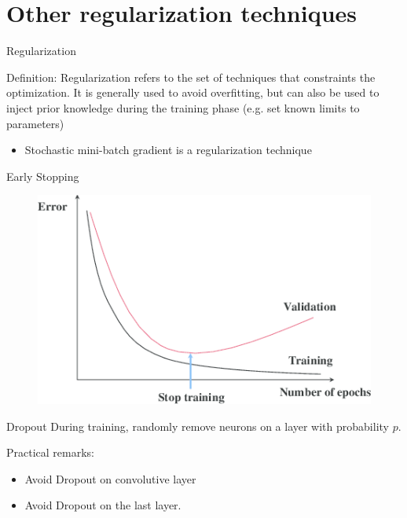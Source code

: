 \documentclass[handout]{beamer}
\begin{document}
\section{Other regularization techniques}
\begin{frame}{Regularization}
\begin{block}{Definition:}
\alert{Regularization} refers to the \alert{set of techniques} that \alert{constraints} the optimization. It is generally used to \alert{avoid overfitting}, but can also be used to inject prior knowledge during the training phase (e.g. set known limits to parameters)
\end{block}
\pause
\begin{itemize}
    \item Stochastic mini-batch gradient is a regularization technique
\end{itemize}

\end{frame}

\begin{frame}{Early Stopping}
    \begin{figure}
        \centering
        \includegraphics[width=\textwidth]{fig/L3/early_stopping.png}
    \end{figure}
\end{frame}
\begin{frame}{Dropout}
During training, randomly remove neurons on a layer with probability $p$.
 \begin{figure}
        \centering
{}       
    \end{figure}
    \pause
    \begin{alertblock}{Practical remarks:}
    \begin{itemize}
        \item Avoid Dropout on convolutive layer
        \item Avoid Dropout on the last layer.
    \end{itemize}
    \end{alertblock}
    
    \end{frame}
    
\end{document}
